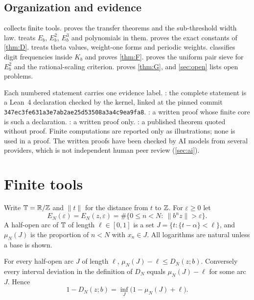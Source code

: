 \documentclass[11pt]{article}
\newcommand{\dist}[1]{\lVert #1\rVert}
\newcommand{\fr}[1]{\{#1\}}
\newcommand{\cnt}{\#}
\begin{document}
\subsection{Organization and evidence}\label{subsec:evidence}

 collects finite tools.  proves the transfer
theorems and the sub-threshold width law.  treats $E_b$, $E_b^2$,
$E_b^3$ and polynomials in them.  proves the exact constants of
\cref{thm:D}.  treats theta values, weight-one forms and periodic
weights.  classifies digit frequencies inside $K_b$ and proves
\cref{thm:F}.  proves the uniform pair sieve for $E_b^2$ and the
rational-scaling criterion.  proves \cref{thm:G}, and
\cref{sec:open} lists open problems.

Each numbered statement carries one evidence label.
: the complete statement is a Lean~4 declaration checked
by the kernel, linked at the pinned commit
\texttt{347ec3fe631a3e7ab2ae25d53508a3a4c9ea9fa8}.
: a written proof whose finite core is such a
declaration. : a written proof only.
: a published theorem quoted without proof. Finite
computations are reported only as illustrations; none is used in a proof. The
written proofs have been checked by AI models from several providers, which is not
independent human peer review (\cref{sec:ai}).

\section{Finite tools}\label{sec:prelim}

Write $\mathbb T=\mathbb R/\mathbb Z$ and $\dist t$ for the distance from $t$ to $\mathbb Z$. For $\varepsilon\ge0$
let
\[
E_N(\varepsilon)=E_N(z,\varepsilon)=\cnt\{0\le n<N:\ \dist{b^nz}>\varepsilon\}.
\]
A half-open arc of $\mathbb T$ of length $\ell\in[0,1]$ is a set $J=\{t:\fr{t-\alpha}<\ell\}$,
and $\mu_N(J)$ is the proportion of $n<N$ with $x_n\in J$. All logarithms are natural
unless a base is shown.

\begin{lemma}\label{lem:arcs}
For every half-open arc $J$ of length $\ell$, $\mu_N(J)-\ell\le D_N(z;b)$.
Conversely every interval deviation in the definition of $D_N$ equals
$\mu_N(J)-\ell$ for some arc $J$. Hence
\[
1-D_N(z;b)=\inf_J\bigl(1-\mu_N(J)+\ell\bigr).
\]
\end{lemma}
\end{document}
